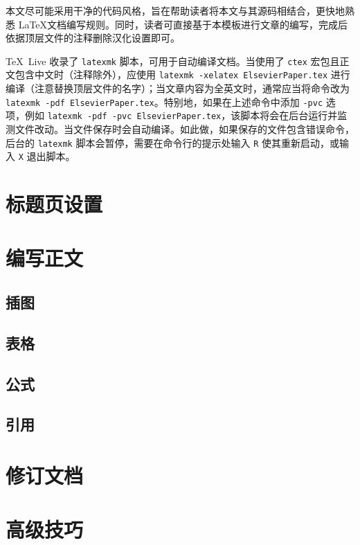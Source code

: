本文尽可能采用干净的代码风格，旨在帮助读者将本文与其源码相结合，更快地熟悉 \LaTeX 文档编写规则。同时，读者可直接基于本模板进行文章的编写，完成后依据顶层文件的注释删除汉化设置即可。


\TeX~Live 收录了 \verb|latexmk| 脚本，可用于自动编译文档。当使用了 \verb|ctex| 宏包且正文包含中文时（注释除外），应使用 \verb|latexmk -xelatex ElsevierPaper.tex| 进行编译（注意替换顶层文件的名字）；当文章内容为全英文时，通常应当将命令改为 \verb|latexmk -pdf ElsevierPaper.tex|。特别地，如果在上述命令中添加 \verb|-pvc| 选项，例如 \verb|latexmk -pdf -pvc ElsevierPaper.tex|，该脚本将会在后台运行并监测文件改动。当文件保存时会自动编译。如此做，如果保存的文件包含错误命令，后台的 \verb|latexmk| 脚本会暂停，需要在命令行的提示处输入 \verb|R| 使其重新启动，或输入 \verb|X| 退出脚本。




\section{标题页设置}


\section{编写正文}

\subsection{插图}
\subsection{表格}
\subsection{公式}
\subsection{引用}

\section{修订文档}

\section{高级技巧}


